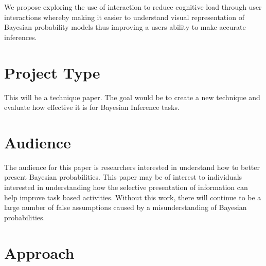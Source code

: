 \documentclass{proc}
\begin{document}
We propose exploring the use of interaction to reduce cognitive load through user interactions whereby making it easier to understand visual representation of Bayesian probability models thus improving a users ability to make accurate inferences.

 

\section{Project Type}

This will be a technique paper. The goal would be to create a new technique and evaluate how effective it is for Bayesian Inference tasks. 

\section{Audience} 

The audience for this paper is researchers interested in understand how to better present Bayesian probabilities. This paper may be of interest to individuals interested in understanding how the selective presentation of information can help improve task based activities. Without this work, there will continue to be a large number of false assumptions caused by a misunderstanding of Bayesian probabilities. 

\section{Approach}
\end{document}
